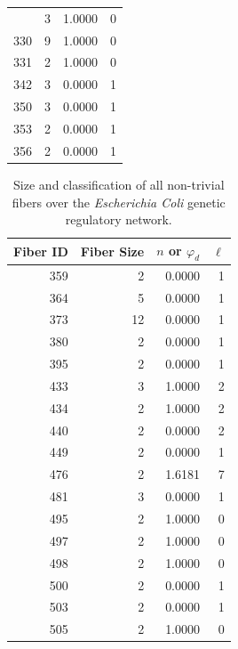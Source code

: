\documentclass[12pt]{diazessay} %
\begin{document}
\begin{table}[b]
\begin{tabular}{r|r|r|r}
&           3 &             1.0000 &          0 \\      330 &           9 &             1.0000 &          0 \\      331 &           2 &             1.0000 &          0 \\      342 &           3 &             0.0000 &          1 \\      350 &           3 &             0.0000 &          1 \\      353 &           2 &             0.0000 &          1 \\      356 &           2 &             0.0000 &          1 \\
	\end{tabular}
\end{table}

\begin{table}[b]
	\centering
	\begin{tabular}{r|r|r|r}
		
		Fiber ID &  Fiber Size &  $n$ or $\varphi_d$ &  $\ell$ \\ \hline
				 359 &           2 &             0.0000 &          1 \\      364 &           5 &             0.0000 &          1 \\      373 &          12 &             0.0000 &          1 \\      380 &           2 &             0.0000 &          1 \\      395 &           2 &             0.0000 &          1 \\      433 &           3 &             1.0000 &          2 \\      434 &           2 &             1.0000 &          2 \\      440 &           2 &             0.0000 &          2 \\      449 &           2 &             0.0000 &          1 \\      476 &           2 &             1.6181 &          7 \\      481 &           3 &             0.0000 &          1 \\      495 &           2 &             1.0000 &          0 \\      497 &           2 &             1.0000 &          0 \\      498 &           2 &             1.0000 &          0 \\      500 &           2 &             0.0000 &          1 \\      503 &           2 &             0.0000 &          1 \\      505 &           2 &             1.0000 &          0 \\
				 \hline
	\end{tabular}
	\caption{Size and classification of all non-trivial fibers over the \textit{Escherichia Coli} genetic regulatory network.}
\end{table}
\end{document}
